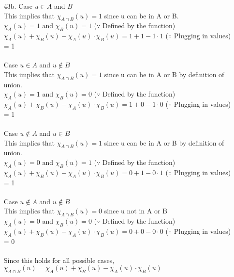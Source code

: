 \documentclass[12pt]{article}
\begin{document}
\begin{itemize}
    \item [43b.]
        Case $u \in A$ and $B$ \\
        This implies that $\chi_{A \cap B}(u) = 1$ since u can be in A or B. \\
        $\chi_{A}(u) = 1$ and $\chi_{B}(u) = 1$ \hspace{3em} ($\because$ Defined by
            the function) \\
        $\chi_{A}(u) + \chi_{B}(u) - \chi_{A}(u) \cdot \chi_{B}(u) = 1 + 1 - 1 \cdot 1$
            \hspace{2em} ($\because$ Plugging in values) \\
        = 1 \\
        \\
        Case $u \in A$ and $u \notin B$ \\
        This implies that $\chi_{A \cap B}(u) = 1$ since u can be in A or B by definition
            of union. \\
        $\chi_{A}(u) = 1$ and $\chi_{B}(u) = 0$ \hspace{3em} ($\because$ Defined by
            the function) \\
        $\chi_{A}(u) + \chi_{B}(u) - \chi_{A}(u) \cdot \chi_{B}(u) = 1 + 0 - 1 \cdot 0$
            \hspace{2em} ($\because$ Plugging in values) \\
        = 1 \\
        \\
        Case $u \notin A$ and $u \in B$ \\
        This implies that $\chi_{A \cap B}(u) = 1$ since u can be in A or B by definition
            of union. \\
        $\chi_{A}(u) = 0$ and $\chi_{B}(u) = 1$ \hspace{3em} ($\because$ Defined by
            the function) \\
        $\chi_{A}(u) + \chi_{B}(u) - \chi_{A}(u) \cdot \chi_{B}(u) = 0 + 1 - 0 \cdot 1$
            \hspace{2em} ($\because$ Plugging in values) \\
        = 1 \\
        \\
        Case $u \notin A$ and $u \notin B$ \\
        This implies that $\chi_{A \cap B}(u) = 0$ since u not in A or B \\
        $\chi_{A}(u) = 0$ and $\chi_{B}(u) = 0$ \hspace{3em} ($\because$ Defined by
            the function) \\
        $\chi_{A}(u) + \chi_{B}(u) - \chi_{A}(u) \cdot \chi_{B}(u) = 0 + 0 - 0 \cdot 0$
            \hspace{2em} ($\because$ Plugging in values) \\
        = 0 \\
        \\
        Since this holds for all possible cases, $\chi_{A \cap B}(u) = \chi_{A}(u) +
            \chi_{B}(u) - \chi_{A}(u) \cdot \chi_{B}(u)$

\end{itemize}
\end{document}

